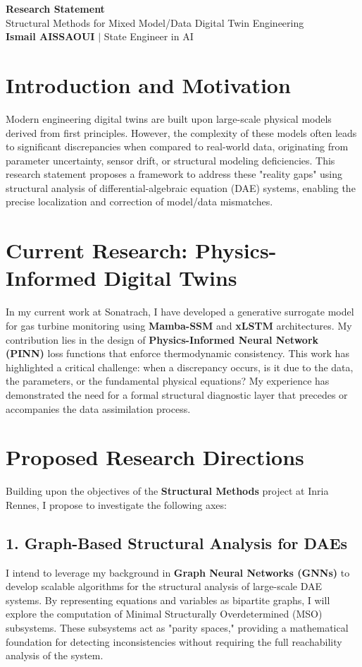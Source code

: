 \documentclass[a4paper,11pt]{article}
\begin{document}
\begin{center}
    {\LARGE\bfseries\color{titleblue} Research Statement}\\[6pt]
    {\large Structural Methods for Mixed Model/Data Digital Twin Engineering}\\[4pt]
    \textbf{Ismail AISSAOUI} $|$ State Engineer in AI
\end{center}

\bigskip

\section{Introduction and Motivation}
Modern engineering digital twins are built upon large-scale physical models derived from first principles. However, the complexity of these models often leads to significant discrepancies when compared to real-world data, originating from parameter uncertainty, sensor drift, or structural modeling deficiencies. This research statement proposes a framework to address these "reality gaps" using structural analysis of differential-algebraic equation (DAE) systems, enabling the precise localization and correction of model/data mismatches.

\section{Current Research: Physics-Informed Digital Twins}
In my current work at Sonatrach, I have developed a generative surrogate model for gas turbine monitoring using \textbf{Mamba-SSM} and \textbf{xLSTM} architectures. My contribution lies in the design of \textbf{Physics-Informed Neural Network (PINN)} loss functions that enforce thermodynamic consistency. This work has highlighted a critical challenge: when a discrepancy occurs, is it due to the data, the parameters, or the fundamental physical equations? My experience has demonstrated the need for a formal structural diagnostic layer that precedes or accompanies the data assimilation process.

\section{Proposed Research Directions}
Building upon the objectives of the \textbf{Structural Methods} project at Inria Rennes, I propose to investigate the following axes:

\subsection{1. Graph-Based Structural Analysis for DAEs}
I intend to leverage my background in \textbf{Graph Neural Networks (GNNs)} to develop scalable algorithms for the structural analysis of large-scale DAE systems. By representing equations and variables as bipartite graphs, I will explore the computation of Minimal Structurally Overdetermined (MSO) subsystems. These subsystems act as "parity spaces," providing a mathematical foundation for detecting inconsistencies without requiring the full reachability analysis of the system.
\end{document}
